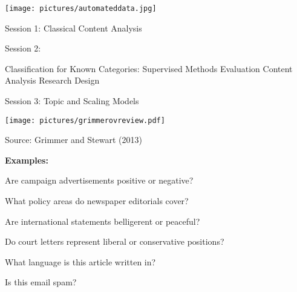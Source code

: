 \documentclass[kp]{foilpack}
\author{\textbf{Will Lowe} (University of Mannheim)\\ \textbf{Sven-Oliver Proksch} (McGill University)}
\date{}
\begin{document}
\maketitle

%
%
%
%
%


%




\begin{center}\texttt{[image: pictures/automateddata.jpg]}
\end{center}





Session 1: Classical Content Analysis

Session 2: 
\ita


\itm Classification for Known Categories: Supervised Methods 
\itm Evaluation
\itm Content Analysis Research Design
\itz

Session 3: Topic and Scaling Models



\centerline{\texttt{[image: pictures/grimmerovreview.pdf]}}
\centerline{\footnotesize Source: Grimmer and Stewart (2013)}






{\bf Examples:}

Are campaign advertisements positive or negative?

What  policy areas do newspaper editorials cover?

Are international statements belligerent or peaceful?

Do court letters represent liberal or conservative positions?

What language is this article written in?

Is this email spam?

\end{document}
